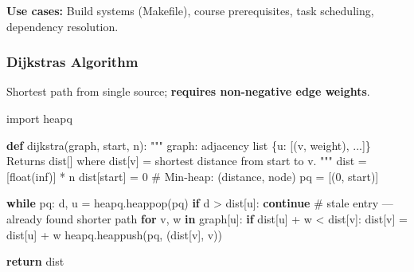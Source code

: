 \documentclass[11pt]{article}
\newenvironment{Shaded}{\begin{snugshade}}{\end{snugshade}}
\newcommand{\BuiltInTok}[1]{\textcolor[rgb]{0.50,0.55,0.55}{#1}}
\newcommand{\CommentTok}[1]{\textcolor[rgb]{0.48,0.49,0.49}{#1}}
\newcommand{\ControlFlowTok}[1]{\textcolor[rgb]{0.99,0.74,0.29}{\textbf{#1}}}
\newcommand{\DecValTok}[1]{\textcolor[rgb]{0.96,0.45,0.00}{#1}}
\newcommand{\ImportTok}[1]{\textcolor[rgb]{0.15,0.68,0.38}{#1}}
\newcommand{\KeywordTok}[1]{\textcolor[rgb]{0.81,0.81,0.76}{\textbf{#1}}}
\newcommand{\NormalTok}[1]{\textcolor[rgb]{0.81,0.81,0.76}{#1}}
\newcommand{\OperatorTok}[1]{\textcolor[rgb]{0.81,0.81,0.76}{#1}}
\newcommand{\StringTok}[1]{\textcolor[rgb]{0.96,0.31,0.31}{#1}}
\begin{document}
\textbf{Use cases:} Build systems (Makefile), course prerequisites, task scheduling, dependency resolution.

\subsubsection{Dijkstra\textquotesingle s Algorithm}\label{dijkstras-algorithm}

Shortest path from single source; \textbf{requires non-negative edge weights}.


\begin{Shaded}
\begin{Highlighting}[]
\ImportTok{import}\NormalTok{ heapq}

\KeywordTok{def}\NormalTok{ dijkstra(graph, start, n):}
    \CommentTok{"""}
\CommentTok{    graph: adjacency list \{u: [(v, weight), ...]\}}
\CommentTok{    Returns dist[] where dist[v] = shortest distance from start to v.}
\CommentTok{    """}
\NormalTok{    dist }\OperatorTok{=}\NormalTok{ [}\BuiltInTok{float}\NormalTok{(}\StringTok{\textquotesingle{}inf\textquotesingle{}}\NormalTok{)] }\OperatorTok{*}\NormalTok{ n}
\NormalTok{    dist[start] }\OperatorTok{=} \DecValTok{0}
    \CommentTok{\# Min{-}heap: (distance, node)}
\NormalTok{    pq }\OperatorTok{=}\NormalTok{ [(}\DecValTok{0}\NormalTok{, start)]}

    \ControlFlowTok{while}\NormalTok{ pq:}
\NormalTok{        d, u }\OperatorTok{=}\NormalTok{ heapq.heappop(pq)}
        \ControlFlowTok{if}\NormalTok{ d }\OperatorTok{\textgreater{}}\NormalTok{ dist[u]:}
            \ControlFlowTok{continue}    \CommentTok{\# stale entry — already found shorter path}
        \ControlFlowTok{for}\NormalTok{ v, w }\KeywordTok{in}\NormalTok{ graph[u]:}
            \ControlFlowTok{if}\NormalTok{ dist[u] }\OperatorTok{+}\NormalTok{ w }\OperatorTok{\textless{}}\NormalTok{ dist[v]:}
\NormalTok{                dist[v] }\OperatorTok{=}\NormalTok{ dist[u] }\OperatorTok{+}\NormalTok{ w}
\NormalTok{                heapq.heappush(pq, (dist[v], v))}

    \ControlFlowTok{return}\NormalTok{ dist}


\end{Highlighting}
\end{Shaded}
\end{document}
